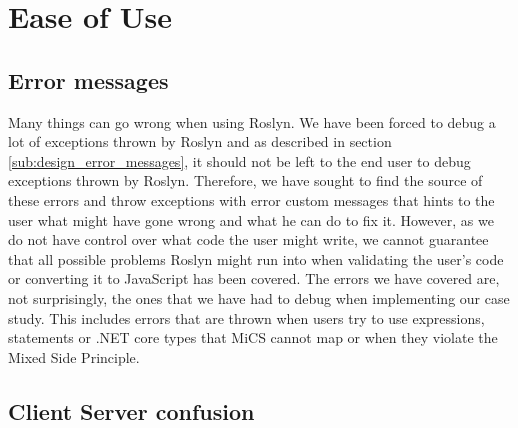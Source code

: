 \section{Ease of Use} %
\label{sec:ease_of_use}
	\subsection{Error messages} %
	\label{sub:evaluation_of_error_messages}
		Many things can go wrong when using Roslyn. We have been forced to debug a lot of exceptions thrown by Roslyn and as described in section \ref{sub:design_error_messages}, it should not be left to the end user to debug exceptions thrown by Roslyn. Therefore, we have sought to find the source of these errors and throw exceptions with error custom messages that hints to the user what might have gone wrong and what he can do to fix it. However, as we do not have control over what code the user might write, we cannot guarantee that all possible problems Roslyn might run into when validating the user's code or converting it to JavaScript has been covered. The errors we have covered are, not surprisingly, the ones that we have had to debug when implementing our case study. This includes errors that are thrown when users try to use expressions, statements or .NET core types that MiCS cannot map or when they violate the Mixed Side Principle.

	\subsection{Client Server confusion} %
	\label{sub:client_server_confusion}
	








